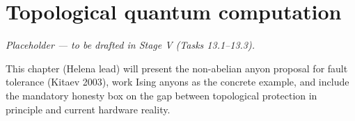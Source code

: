 \chapter{Topological quantum computation}\label{ch:tqc}

\emph{Placeholder --- to be drafted in Stage V (Tasks 13.1--13.3).}

This chapter (Helena lead) will present the non-abelian anyon proposal for fault tolerance (Kitaev 2003), work Ising anyons as the concrete example, and include the mandatory honesty box on the gap between topological protection in principle and current hardware reality.
